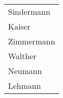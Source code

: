 \begin{enumerate}
\begin{center}
\begin{small}
{            }
            \tablehead{}
            \tabletail {
            }
            \begin{msoraclesql}
              \begin{supertabular}{l}
                Sindermann \\
                Kaiser \\
                Zimmermann \\
                Walther \\
                Neumann \\
                Lehmann \\
              \end{supertabular}
            \end{msoraclesql}
          \end{small}
        \end{center}
      \end{enumerate}
